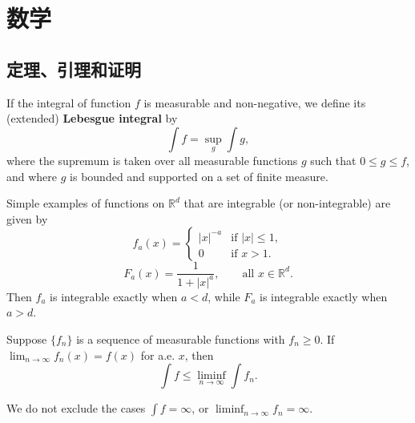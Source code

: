 \chapter{数学}

\section{定理、引理和证明}

\begin{definition}
    If the integral of function $f$ is measurable and non-negative, we define
    its (extended) \textbf{Lebesgue integral} by
    \begin{equation}
        \int f = \sup_g \int g,
    \end{equation}
    where the supremum is taken over all measurable functions $g$ such that
    $0 \leq g \leq f$, and where $g$ is bounded and supported on a set of
    finite measure.
\end{definition}

\begin{example}
    Simple examples of functions on $\mathbb{R}^d$ that are integrable
    (or non-integrable) are given by
    \begin{equation}
        f_a(x) =
        \begin{cases}
            |x|^{-a} & \text{if } |x| \leq 1,\\
            0 & \text{if } x > 1.
        \end{cases}
    \end{equation}
    \begin{equation}
        F_a(x) = \frac{1}{1 + |x|^a}, \qquad \text{all } x \in \mathbb{R}^d.
    \end{equation}
    Then $f_a$ is integrable exactly when $a < d$, while $F_a$ is integrable
    exactly when $a > d$.
\end{example}

\begin{lemma}[Fatou]
    Suppose $\{f_n\}$ is a sequence of measurable functions with $f_n \geq 0$.
    If $\lim_{n \to \infty} f_n(x) = f(x)$ for a.e. $x$, then
    \begin{equation}
        \int f \leq \liminf_{n \to \infty} \int f_n.
    \end{equation}
\end{lemma}

\begin{remark}
    We do not exclude the cases $\int f = \infty$,
    or $\liminf_{n \to \infty} f_n = \infty$.
\end{remark}

